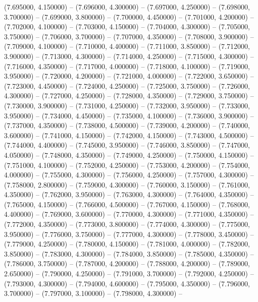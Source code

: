 (7.695000, 4.150000) -- 
(7.696000, 4.300000) -- 
(7.697000, 4.250000) -- 
(7.698000, 3.700000) -- 
(7.699000, 3.800000) -- 
(7.700000, 4.450000) -- 
(7.701000, 4.200000) -- 
(7.702000, 4.100000) -- 
(7.703000, 4.150000) -- 
(7.704000, 4.300000) -- 
(7.705000, 3.750000) -- 
(7.706000, 3.700000) -- 
(7.707000, 4.350000) -- 
(7.708000, 3.900000) -- 
(7.709000, 4.100000) -- 
(7.710000, 4.400000) -- 
(7.711000, 3.850000) -- 
(7.712000, 3.900000) -- 
(7.713000, 4.300000) -- 
(7.714000, 4.250000) -- 
(7.715000, 4.300000) -- 
(7.716000, 4.350000) -- 
(7.717000, 4.000000) -- 
(7.718000, 4.100000) -- 
(7.719000, 3.950000) -- 
(7.720000, 4.200000) -- 
(7.721000, 4.000000) -- 
(7.722000, 3.650000) -- 
(7.723000, 4.450000) -- 
(7.724000, 4.250000) -- 
(7.725000, 3.750000) -- 
(7.726000, 4.300000) -- 
(7.727000, 4.250000) -- 
(7.728000, 4.350000) -- 
(7.729000, 3.750000) -- 
(7.730000, 3.900000) -- 
(7.731000, 4.250000) -- 
(7.732000, 3.950000) -- 
(7.733000, 3.950000) -- 
(7.734000, 4.450000) -- 
(7.735000, 4.100000) -- 
(7.736000, 3.900000) -- 
(7.737000, 4.350000) -- 
(7.738000, 4.500000) -- 
(7.739000, 4.200000) -- 
(7.740000, 3.600000) -- 
(7.741000, 4.150000) -- 
(7.742000, 4.150000) -- 
(7.743000, 4.500000) -- 
(7.744000, 4.400000) -- 
(7.745000, 3.950000) -- 
(7.746000, 3.850000) -- 
(7.747000, 4.050000) -- 
(7.748000, 4.350000) -- 
(7.749000, 4.250000) -- 
(7.750000, 4.150000) -- 
(7.751000, 4.100000) -- 
(7.752000, 4.250000) -- 
(7.753000, 4.200000) -- 
(7.754000, 4.000000) -- 
(7.755000, 4.300000) -- 
(7.756000, 4.250000) -- 
(7.757000, 4.300000) -- 
(7.758000, 2.800000) -- 
(7.759000, 4.300000) -- 
(7.760000, 3.150000) -- 
(7.761000, 4.350000) -- 
(7.762000, 3.950000) -- 
(7.763000, 4.300000) -- 
(7.764000, 4.350000) -- 
(7.765000, 4.150000) -- 
(7.766000, 4.500000) -- 
(7.767000, 4.150000) -- 
(7.768000, 4.400000) -- 
(7.769000, 3.600000) -- 
(7.770000, 4.300000) -- 
(7.771000, 4.350000) -- 
(7.772000, 4.350000) -- 
(7.773000, 3.800000) -- 
(7.774000, 4.300000) -- 
(7.775000, 3.950000) -- 
(7.776000, 3.750000) -- 
(7.777000, 4.300000) -- 
(7.778000, 3.450000) -- 
(7.779000, 4.250000) -- 
(7.780000, 4.150000) -- 
(7.781000, 4.000000) -- 
(7.782000, 3.850000) -- 
(7.783000, 4.300000) -- 
(7.784000, 3.850000) -- 
(7.785000, 4.350000) -- 
(7.786000, 3.750000) -- 
(7.787000, 4.200000) -- 
(7.788000, 4.200000) -- 
(7.789000, 2.650000) -- 
(7.790000, 4.250000) -- 
(7.791000, 3.700000) -- 
(7.792000, 4.250000) -- 
(7.793000, 4.300000) -- 
(7.794000, 4.600000) -- 
(7.795000, 4.350000) -- 
(7.796000, 3.700000) -- 
(7.797000, 3.100000) -- 
(7.798000, 4.300000) -- 
